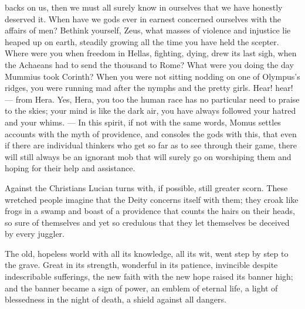 \documentclass[12pt,a4paper,openany]{book}
\newcommand{\opage}[1]{\marginnote{\footnotesize\textit{[#1]}}}
\begin{document}
backs on us, then we must all surely know in ourselves that we have honestly deserved it. When
have we gods ever in earnest concerned ourselves with the affairs of men? Bethink yourself,
Zeus, what masses of violence and injustice lie heaped up on earth, steadily growing all the
time you have held the scepter. Where were you when freedom in Hellas, fighting, dying, drew its
last sigh, when the Achaeans had to send the thousand to Rome? What were you doing the day
Mummius took Corinth? When you were not sitting nodding on one of Olympus's ridges, you were
running mad after the nymphs and the pretty girls. Hear! hear! --- from Hera. Yes, Hera, you
too the human race has no particular need to praise to the skies; your mind is like the dark
air, you have always followed your hatred and your whims. --- In this spirit, if not with the
same words, Momus settles accounts with the myth of providence, and consoles the gods with
this, that even if there are individual thinkers who get so far as to see through their game,
there will still always be an ignorant mob that will surely go on worshiping them and hoping
for their help and assistance.

Against the Christians Lucian turns with, if possible, still greater scorn. These wretched
people imagine that the Deity concerns itself with them; they croak like frogs in a swamp and
boast of a providence
\setcounter{footnote}{0}%
\opage{48}that counts the hairs on their heads, so sure of themselves and yet so credulous that
they let themselves be deceived by every juggler.

The old, hopeless world with all its knowledge, all its wit, went step by step to the grave.
Great in its strength, wonderful in its patience, invincible despite indescribable sufferings,
the new faith with the new hope raised its banner high; and the banner became a sign of power,
an emblem of eternal life, a light of blessedness in the night of death, a shield against all
dangers.
\end{document}
